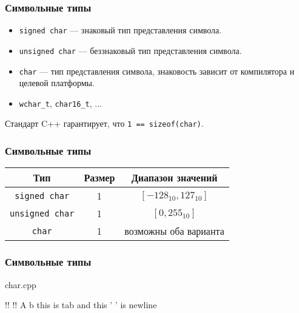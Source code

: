 \documentclass[compress, 8pt]{beamer}
\begin{document}
\begin{frame}[fragile]

    \frametitle{Символьные типы}

    \begin{itemize}
        \item \verb|signed char| --- знаковый тип представления символа.
        \item \verb|unsigned char| --- беззнаковый тип представления символа.
        \item \verb|char| --- тип представления символа, знаковость зависит от
            компилятора и целевой платформы.
        \item \verb|wchar_t|, \verb|char16_t|, ...
    \end{itemize}

    \hfill \break
    Стандарт C++ гарантирует, что \verb|1 == sizeof(char)|.

\end{frame}

\begin{frame}[fragile]

    \frametitle{Символьные типы}

    \begin{center}
        \begin{tabular}{|c|c|c|}
            \hline
            Тип & Размер & Диапазон значений \\
            \hline
            \hline
            \verb|signed char| & 1 & \([-128_{10}, 127_{10}]\) \\
            \verb|unsigned char| & 1 & \([0, 255_{10}]\) \\
            \verb|char| & 1 & возможны оба варианта \\
            \hline
        \end{tabular}
    \end{center}

\end{frame}

\begin{frame}[fragile]

    \frametitle{Символьные типы}

        {char.cpp}

    \begin{terminalwindow}
!!
!!
A
b
this is tab     and this '
' is newline
    \end{terminalwindow}

\end{frame}
\end{document}
